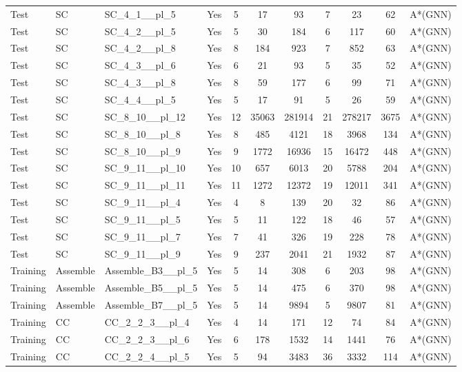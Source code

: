 \documentclass{article}
\begin{document}
\begin{tabular}{lllcccccccc}
Test & SC & SC\_4\_1\_\_pl\_5 & Yes & 5 & 17 & 93 & 7 & 23 & 62 & A*(GNN) \\
Test & SC & SC\_4\_2\_\_pl\_5 & Yes & 5 & 30 & 184 & 6 & 117 & 60 & A*(GNN) \\
Test & SC & SC\_4\_2\_\_pl\_8 & Yes & 8 & 184 & 923 & 7 & 852 & 63 & A*(GNN) \\
Test & SC & SC\_4\_3\_\_pl\_6 & Yes & 6 & 21 & 93 & 5 & 35 & 52 & A*(GNN) \\
Test & SC & SC\_4\_3\_\_pl\_8 & Yes & 8 & 59 & 177 & 6 & 99 & 71 & A*(GNN) \\
Test & SC & SC\_4\_4\_\_pl\_5 & Yes & 5 & 17 & 91 & 5 & 26 & 59 & A*(GNN) \\
Test & SC & SC\_8\_10\_\_pl\_12 & Yes & 12 & 35063 & 281914 & 21 & 278217 & 3675 & A*(GNN) \\
Test & SC & SC\_8\_10\_\_pl\_8 & Yes & 8 & 485 & 4121 & 18 & 3968 & 134 & A*(GNN) \\
Test & SC & SC\_8\_10\_\_pl\_9 & Yes & 9 & 1772 & 16936 & 15 & 16472 & 448 & A*(GNN) \\
Test & SC & SC\_9\_11\_\_pl\_10 & Yes & 10 & 657 & 6013 & 20 & 5788 & 204 & A*(GNN) \\
Test & SC & SC\_9\_11\_\_pl\_11 & Yes & 11 & 1272 & 12372 & 19 & 12011 & 341 & A*(GNN) \\
Test & SC & SC\_9\_11\_\_pl\_4 & Yes & 4 & 8 & 139 & 20 & 32 & 86 & A*(GNN) \\
Test & SC & SC\_9\_11\_\_pl\_5 & Yes & 5 & 11 & 122 & 18 & 46 & 57 & A*(GNN) \\
Test & SC & SC\_9\_11\_\_pl\_7 & Yes & 7 & 41 & 326 & 19 & 228 & 78 & A*(GNN) \\
Test & SC & SC\_9\_11\_\_pl\_9 & Yes & 9 & 237 & 2041 & 21 & 1932 & 87 & A*(GNN) \\
Training & Assemble & Assemble\_B3\_\_pl\_5 & Yes & 5 & 14 & 308 & 6 & 203 & 98 & A*(GNN) \\
Training & Assemble & Assemble\_B5\_\_pl\_5 & Yes & 5 & 14 & 475 & 6 & 370 & 98 & A*(GNN) \\
Training & Assemble & Assemble\_B7\_\_pl\_5 & Yes & 5 & 14 & 9894 & 5 & 9807 & 81 & A*(GNN) \\
Training & CC & CC\_2\_2\_3\_\_pl\_4 & Yes & 4 & 14 & 171 & 12 & 74 & 84 & A*(GNN) \\
Training & CC & CC\_2\_2\_3\_\_pl\_6 & Yes & 6 & 178 & 1532 & 14 & 1441 & 76 & A*(GNN) \\
Training & CC & CC\_2\_2\_4\_\_pl\_5 & Yes & 5 & 94 & 3483 & 36 & 3332 & 114 & A*(GNN) \\

\end{tabular}
\end{document}
